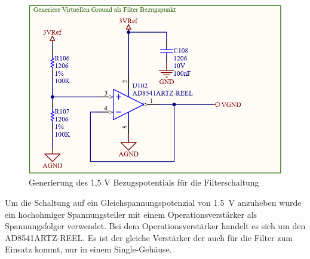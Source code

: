 \begin{figure} [!h]
	\includegraphics[width=\textwidth] {EKG_virtueller_Ground.png}
	\caption{Generierung des 1,5 V Bezugspotentials für die Filterschaltung}
	\label{Virtueller GND} 
\end{figure}

Um die Schaltung auf ein Gleichspannungspotenzial von \SI{1,5}{\volt} anzuheben wurde ein hochohmiger Spannungsteiler mit einem Operationsverstärker als Spannungsfolger verwendet. Bei dem Operationsverstärker handelt es sich um den AD8541ARTZ-REEL. Es ist der gleiche Verstärker der auch für die Filter zum Einsatz kommt, nur in einem Single-Gehäuse.




